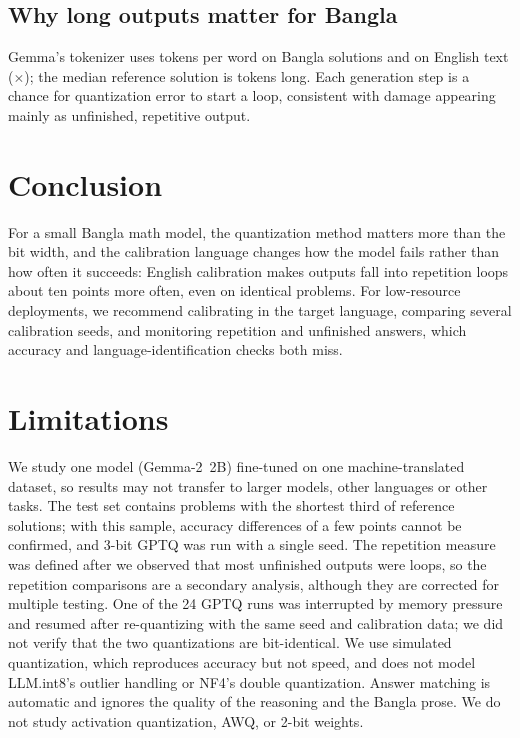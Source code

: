 \documentclass[11pt]{article}
\begin{document}
\subsection{Why long outputs matter for Bangla}

Gemma's tokenizer uses \FertBangla{} tokens per word on Bangla solutions and \FertEnglish{} on English text (\FertRatio$\times$); the median reference solution is \SolutionTokens{} tokens long. Each generation step is a chance for quantization error to start a loop, consistent with damage appearing mainly as unfinished, repetitive output.

\section{Conclusion}

For a small Bangla math model, the quantization method matters more than the bit width, and the calibration language changes how the model fails rather than how often it succeeds: English calibration makes outputs fall into repetition loops about ten points more often, even on identical problems. For low-resource deployments, we recommend calibrating in the target language, comparing several calibration seeds, and monitoring repetition and unfinished answers, which accuracy and language-identification checks both miss.

\section*{Limitations}

We study one model (Gemma-2~2B) fine-tuned on one machine-translated dataset, so results may not transfer to larger models, other languages or other tasks. The test set contains \NumEval{} problems with the shortest third of reference solutions; with this sample, accuracy differences of a few points cannot be confirmed, and 3-bit GPTQ was run with a single seed. The repetition measure was defined after we observed that most unfinished outputs were loops, so the repetition comparisons are a secondary analysis, although they are corrected for multiple testing. One of the 24 GPTQ runs was interrupted by memory pressure and resumed after re-quantizing with the same seed and calibration data; we did not verify that the two quantizations are bit-identical. We use simulated quantization, which reproduces accuracy but not speed, and does not model LLM.int8's outlier handling or NF4's double quantization. Answer matching is automatic and ignores the quality of the reasoning and the Bangla prose. We do not study activation quantization, AWQ, or 2-bit weights.
\end{document}
